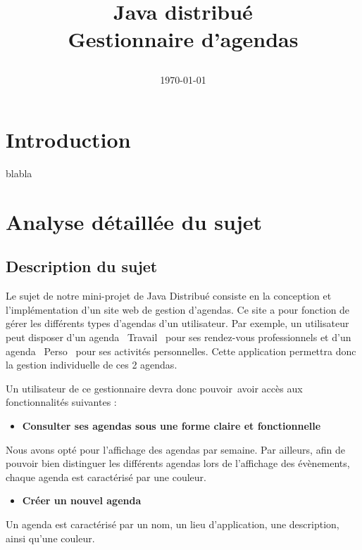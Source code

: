 \documentclass[12pt , a4paper]{article}
\title{Java distribué\\
  \vspace{0.6cm}
  \normalsize{Gestionnaire d'agendas} 
  \begin{center}
  \end{center}
}
\author{\Auteur}
\date{\today}
\begin{document}
\maketitle
\thispagestyle{empty}
\newpage
\thispagestyle{plain}%

\tableofcontents
\newpage
\section{Introduction}
\noindent blabla

\newpage
\section{Analyse détaillée du sujet}

\subsection{Description du sujet}
Le sujet de notre mini-projet de Java Distribu\'e consiste en la
conception et l{\textquoteright}impl\'ementation d{\textquoteright}un
site web de gestion d{\textquoteright}agendas. Ce site a pour fonction
de g\'erer les diff\'erents types d{\textquoteright}agendas
d{\textquoteright}un utilisateur. Par exemple, un utilisateur peut
disposer d{\textquoteright}un agenda
{\guillemotleft}~Travail~{\guillemotright} pour ses rendez-vous
professionnels et d{\textquoteright}un agenda
{\guillemotleft}~Perso~{\guillemotright} pour ses activit\'es
personnelles. Cette application permettra donc la gestion individuelle
de ces 2 agendas.


\vspace{0.5cm}

\noindent Un utilisateur de ce gestionnaire devra donc pouvoir~avoir acc\`es aux
fonctionnalit\'es suivantes :


\begin{itemize}
\item \textbf{Consulter ses agendas sous une forme claire et
    fonctionnelle}
\end{itemize}
Nous avons opt\'e pour l{\textquoteright}affichage des agendas par
semaine. Par ailleurs, afin de pouvoir bien distinguer les diff\'erents
agendas lors de l{\textquoteright}affichage des \'ev\`enements, chaque
agenda est caract\'eris\'e par une couleur.

\vspace{0.5cm}
\begin{itemize}
\item \textbf{Cr\'eer un nouvel agenda}
\end{itemize}
Un agenda est caract\'eris\'e par un nom, un lieu
d{\textquoteright}application, une description, ainsi
qu{\textquoteright}une couleur.
\end{document}
